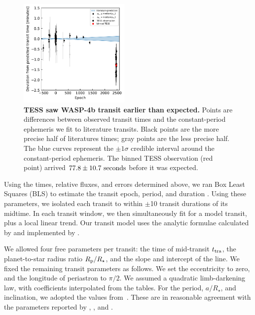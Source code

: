 \documentclass[12pt,twocolumn,tighten]{aastex62}
\begin{document}
\begin{figure}[t]
    \begin{center}
        \leavevmode
        \includegraphics[width=0.48\textwidth]{f2.pdf}
    \end{center}
    \vspace{-0.5cm}
    \caption{
        {\bf TESS saw WASP-4b transit earlier than expected.}
        Points are differences between observed transit times and the
        constant-period ephemeris we fit to literature transits.
        Black points are the more precise half of literatures times;
        gray points are the less precise half.  The blue curves
        represent the $\pm 1\sigma$ credible interval around the
        constant-period ephemeris.  The binned TESS observation (red
        point) arrived $77.8 \pm 10.7\ {\rm seconds}$ before it was
        expected.
        \label{fig:arrived_early}
    }
\end{figure}

Using the times, relative fluxes, and errors determined above, we ran
Box Least Squares (BLS) to estimate the transit epoch, period, and
duration \citep{kovacs_box-fitting_2002}.  Using these parameters, we
isolated each transit to within $\pm$10 transit durations of its
midtime.  In each transit window, we then simultaneously fit for a model
transit, plus a local linear trend.  Our transit model uses the analytic
formulae calculated by \citet{mandel_analytic_2002} and implemented by
\citet{kreidberg_batman_2015}.

We allowed four free parameters per transit: the
time of mid-transit $t_{\rm tra}$, the planet-to-star radius ratio
$R_{\rm p}/R_\star$, and the slope and intercept of the line.
We fixed the remaining transit parameters as follows.  We set the
eccentricity to zero, and the longitude of periastron to $\pi/2$.  We
assumed a quadratic limb-darkening law, with coefficients interpolated
from the \citet{claret_limb_2017} tables.  For the period, $a/R_\star$,
and inclination, we adopted the values from~\citet{petrucci_no_2013}.
These are in reasonable agreement with the parameters reported by
\citet{gillon_improved_2009}, \citet{southworth_high-precision_2009},
and \citet{huitson_gemini_2017}.
\end{document}
